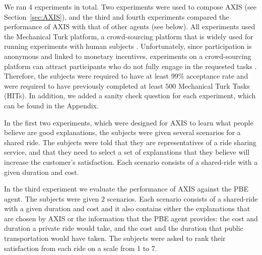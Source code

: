 \documentclass[letterpaper]{article} %
\begin{document}
We ran 4 experiments in total. Two experiments were used to compose AXIS (see Section~\ref{sec:AXIS}), and the third and fourth experiments compared the performance of AXIS with that of other agents (see below). 
All experiments used the Mechanical Turk platform, a crowd-sourcing platform that is widely used for running experiments with human subjects \cite{amir2012economic,paolacci2010running}. 
Unfortunately, since participation is anonymous and linked to monetary incentives, experiments on a crowd-sourcing platform can attract participants who do not fully engage in the requested tasks \cite{turner2012using}. Therefore, the subjects were required to have at least $99\%$ acceptance rate and were required to have previously completed at least $500$ Mechanical Turk Tasks (HITs). In addition, we added a sanity check question for each experiment, which can be found in the Appendix.

In the first two experiments, which were designed for AXIS to learn what people believe are good explanations, the subjects were given several scenarios for a shared ride. The subjects were told that they are representatives of a ride sharing service, and that they need to select a set of explanations that they believe will increase the customer's satisfaction. Each scenario consists of a shared-ride with a given duration and cost. 

In the third experiment we evaluate the performance of AXIS against the PBE agent. %
The subjects were given $2$ scenarios. Each scenario consists of a shared-ride with a given duration and cost and it also contains either the explanations that are chosen by AXIS or the information that the PBE agent provides: 
the cost and duration a private ride would take, and the cost and the duration that public transportation would have taken. The subjects were asked to rank their satisfaction from each ride on a scale from 1 to 7.
\end{document}
